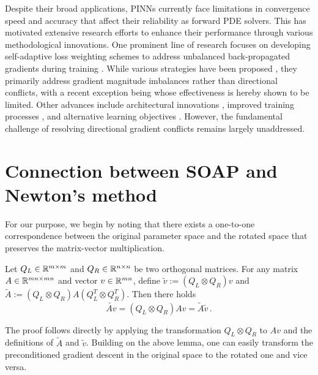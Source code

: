 Despite their broad applications, PINNs currently face limitations in convergence speed and accuracy that affect their reliability as forward PDE solvers. This has motivated extensive research efforts to enhance their performance through various methodological innovations.  One prominent line of research focuses on developing self-adaptive loss weighting schemes to address unbalanced back-propagated gradients during training \cite{wang2021understanding,wang2022and}. While various strategies have been proposed \cite{wang2023expert,wang2021understanding,wang2022and,li2022revisiting,chen2024self,anagnostopoulos2024residual,liu2024discontinuity,song2025vw}, they primarily address gradient magnitude imbalances rather than directional conflicts, with a recent exception being \cite{liu2024config} whose effectiveness is hereby shown to be limited. Other advances include architectural innovations \cite{wang2021understanding,sitzmann2020implicit,fathony2021multiplicative,moseley2021finite,kang2022pixel,cho2024separable,wang2024piratenets}, improved training processes \cite{nabian2021efficient,daw2022rethinking,wu2023comprehensive,muller2023achieving,jnini2024gauss,song2024admm,urban2025unveiling,wight2020solving,krishnapriyan2021characterizing,cao2023tsonn}, and alternative learning objectives \cite{chiu2022can,huang2024efficient,kharazmi2021hp,patel2022thermodynamically,yu2022gradient,son2021sobolev}. However, the fundamental challenge of resolving directional gradient conflicts remains largely unaddressed.




\section{Connection between SOAP and Newton's method}  \label{app:soap_newton}

For our purpose, we begin by noting that there exists a one-to-one correspondence between the original parameter space and the rotated space that preserves the matrix-vector multiplication. 
\begin{lemma}
\label{lemma: equivalence}
Let $Q_L \in \mathbb{R}^{m \times m}$ and $Q_R \in \mathbb{R}^{n \times n}$ be two orthogonal matrices. For any matrix $A \in \mathbb{R}^{mn \times mn}$ and vector $v \in \mathbb{R}^{m n}$, define $\widetilde{v} := (Q_L \otimes Q_R)v$ and $\widetilde{A} := (Q_L\otimes Q_R)A(Q_L^T \otimes Q_R^T)$. Then there holds 
\begin{equation*}
    \widetilde{A v} = (Q_L \otimes Q_R) A v = \widetilde{A} \widetilde{v}\,.
\end{equation*}
\end{lemma}
The proof follows directly by applying the transformation $Q_L \otimes Q_R$ to $A v$ and the definitions of $\widetilde{A}$ and $\widetilde{v}$. Building on the above lemma, one can easily transform the preconditioned gradient descent in the original space to the rotated one and vice versa. 



